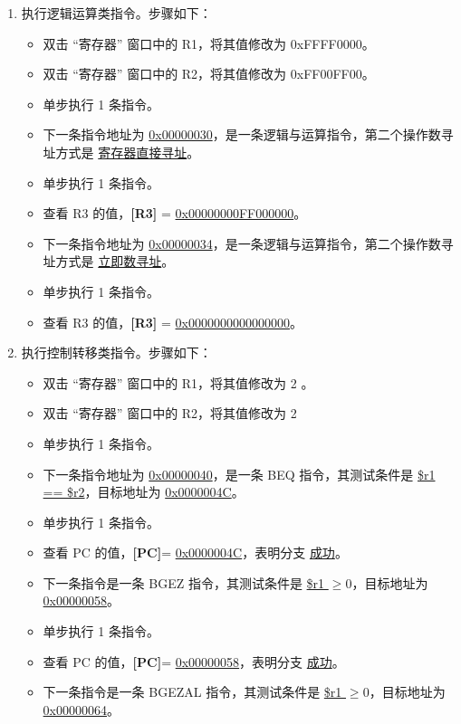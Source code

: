 \documentclass[blue,normal,cn]{elegantnote}
\begin{document}
\begin{enumerate}[wide=0pt, listparindent=2em, parsep=0pt]
    \item 执行逻辑运算类指令。步骤如下：

          \begin{itemize}[leftmargin=3em]
              \item 双击 “寄存器” 窗口中的 R1，将其值修改为 0xFFFF0000。
              \item 双击 “寄存器” 窗口中的 R2，将其值修改为 0xFF00FF00。
              \item 单步执行 1 条指令。
              \item 下一条指令地址为 \uline{0x00000030}，是一条逻辑与运算指令，第二个操作数寻址方式是 \uline{寄存器直接寻址}。
              \item 单步执行 1 条指令。
              \item 查看 R3 的值，\textbf{[R3]} = \uline{0x00000000FF000000}。
              \item 下一条指令地址为 \uline{0x00000034}，是一条逻辑与运算指令，第二个操作数寻址方式是 \uline{立即数寻址}。
              \item 单步执行 1 条指令。
              \item 查看 R3 的值，\textbf{[R3]} = \uline{0x0000000000000000}。
          \end{itemize}
    \item 执行控制转移类指令。步骤如下：
          \begin{itemize}[leftmargin=3em]
              \item 双击 “寄存器” 窗口中的 R1，将其值修改为 2
                    。
              \item 双击 “寄存器” 窗口中的 R2，将其值修改为 2
              \item 单步执行 1 条指令。
              \item 下一条指令地址为 \uline{0x00000040}，是一条 BEQ 指令，其测试条件是 \uline{\$r1 == \$r2}，目标地址为 \uline{0x0000004C}。
              \item 单步执行 1 条指令。
              \item 查看 PC 的值，\textbf{[PC]}= \uline{0x0000004C}，表明分支 \uline{成功}。
              \item 下一条指令是一条 BGEZ 指令，其测试条件是 \uline{\$r1 $\geq 0$}，目标地址为 \uline{0x00000058}。
              \item 单步执行 1 条指令。
              \item 查看 PC 的值，\textbf{[PC]}= \uline{0x00000058}，表明分支 \uline{成功}。
              \item 下一条指令是一条 BGEZAL 指令，其测试条件是 \uline{\$r1 $\geq 0$}，目标地址为 \uline{0x00000064}。

\end{itemize}
\end{enumerate}
\end{document}
